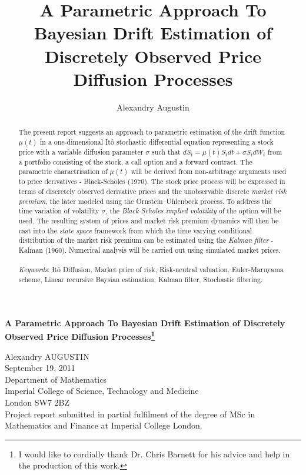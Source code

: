 \documentclass{article}
\author{Alexandry Augustin}
\title{A Parametric Approach To Bayesian Drift Estimation of Discretely Observed Price Diffusion Processes}
\theoremstyle{definition}
\theoremstyle{remark}
\newcommand{\measure}[1]{\ensuremath{\mathbb{#1}}}
\newcommand{\Ito}{It\^{o} }
\begin{document}
\begin{center}
\begin{center}
{\large \bfseries A Parametric Approach To Bayesian Drift Estimation of Discretely Observed Price Diffusion Processes\footnote{I would like to cordially thank Dr. Chris Barnett for his advice and help in the production of this work.}}
\end{center}
\bigskip
Alexandry AUGUSTIN \\
\bigskip
September 19, 2011\\
\bigskip\bigskip
Department of Mathematics\\
Imperial College of Science, Technology and Medicine\\
London SW7 2BZ\\

\bigskip\bigskip\bigskip
Project report submitted in partial fulfilment of the degree of MSc in
Mathematics and Finance at Imperial College London.
\bigskip\bigskip\bigskip

\end{center}
\begin{abstract}
The present report suggests an approach to parametric estimation of the drift function $\mu(t)$ in a one-dimensional \Ito stochastic differential equation representing a stock price with a variable diffusion parameter $\sigma$ such that $dS_t=\mu(t)S_tdt+\sigma S_tdW_t$ from a portfolio consisting of the stock, a call option and a forward contract. The parametric charactrisation of $\mu(t)$ will be derived from non-arbitrage arguments used to price derivatives  - Black-Scholes (1970). The stock price process will be expressed in terms of discretely observed derivative prices and the unobservable discrete \emph{market risk premium}, the later modeled using the Ornstein--Uhlenbeck process. To address the time variation of volatility $\sigma$, the \emph{Black-Scholes implied volatility} of the option will be used. The resulting system of prices and market risk premium dynamics will then be cast into the \emph{state space} framework from which the time varying conditional distribution of the market risk premium can be estimated using the \emph{Kalman filter} - Kalman (1960). Numerical analysis will be carried out using simulated market prices.
\\
\\
\textit{Keywords}: \Ito Diffusion, Market price of risk, Risk-neutral valuation, Euler-Maruyama scheme, Linear recursive Baysian estimation, Kalman filter, Stochastic filtering.
\end{abstract}
\end{document}
